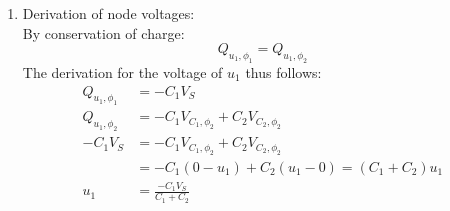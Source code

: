 {\begin{enumerate}
{\begin{enumerate}
{                }
                \item[4.] {
                    Derivation of node voltages: \\
                    By conservation of charge:
                    \[Q_{u_1, \phi_1} = Q_{u_1, \phi_2}\]
                    The derivation for the voltage of $u_1$ thus follows:
                    \begin{align*}
                        Q_{u_1, \phi_1} &= -C_1 V_S \\
                        Q_{u_1, \phi_2} &= -C_1 V_{C_1, \phi_2} + C_2 V_{C_2, \phi_2} \\
                        -C_1 V_S &= -C_1 V_{C_1, \phi_2} + C_2 V_{C_2, \phi_2} \\
                        &= -C_1 (0 - u_1) + C_2 (u_1 - 0) = (C_1 + C_2) u_1 \\
                        u_1 &= \frac{-C_1 V_S}{C_1 + C_2}
                    \end{align*}
                    
}
\end{enumerate}}
\end{enumerate}}
